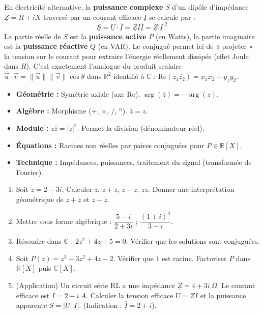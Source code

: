 \documentclass[11pt]{article}
\begin{document}
\begin{savaistu}
En électricité alternative, la \textbf{puissance complexe} $\underline{S}$ d'un dipôle d'impédance $\underline{Z} = R + iX$ traversé par un courant efficace $\underline{I}$ se calcule par :
\[
\underline{S} = \underline{U} \cdot \overline{\underline{I}} = \underline{Z} \underline{I} \overline{\underline{I}} = \underline{Z} |\underline{I}|^2
\]
La partie réelle de $\underline{S}$ est la \textbf{puissance active} $P$ (en Watts), la partie imaginaire est la \textbf{puissance réactive} $Q$ (en VAR).
Le conjugué permet ici de « projeter » la tension sur le courant pour extraire l'énergie réellement dissipée (effet Joule dans $R$). C'est exactement l'analogue du produit scalaire $\vec{u} \cdot \vec{v} = \|\vec{u}\|\|\vec{v}\|\cos\theta$ dans $\mathbb{R}^2$ identifié à $\mathbb{C}$ : $\text{Re}(z_1 \overline{z_2}) = x_1 x_2 + y_1 y_2$.
\end{savaistu}

\begin{aretenir}
\begin{itemize}
    \item \textbf{Géométrie :} Symétrie axiale (axe Re). $\arg(\overline{z}) = -\arg(z)$.
    \item \textbf{Algèbre :} Morphisme ($+$, $\times$, $/$, $^n$). $\overline{\overline{z}}=z$.
    \item \textbf{Module :} $z\overline{z} = |z|^2$. Permet la division (dénominateur réel).
    \item \textbf{Équations :} Racines non réelles par paires conjuguées pour $P \in \mathbb{R}[X]$.
    \item \textbf{Technique :} Impédances, puissances, traitement du signal (transformée de Fourier).
\end{itemize}
\end{aretenir}

\begin{exercice}
\begin{enumerate}
    \item Soit $z = 2 - 3i$. Calculer $\overline{z}$, $z+\overline{z}$, $z-\overline{z}$, $z\overline{z}$. Donner une interprétation géométrique de $z+\overline{z}$ et $z-\overline{z}$.
    \item Mettre sous forme algébrique : $\dfrac{5-i}{2+3i}$ ; $\dfrac{(1+i)^2}{3-i}$.
    \item Résoudre dans $\mathbb{C}$ : $2z^2 + 4z + 5 = 0$. Vérifier que les solutions sont conjuguées.
    \item Soit $P(z) = z^3 - 3z^2 + 4z - 2$. Vérifier que $1$ est racine. Factoriser $P$ dans $\mathbb{R}[X]$ puis $\mathbb{C}[X]$.
    \item (Application) Un circuit série RL a une impédance $\underline{Z} = 4 + 3i \ \Omega$. Le courant efficace est $\underline{I} = 2 - i \ A$. Calculer la tension efficace $\underline{U} = \underline{Z}\underline{I}$ et la puissance apparente $S = |\underline{U}||\underline{I}|$. (Indication : $\overline{\underline{I}} = 2+i$).
\end{enumerate}
\end{exercice}
\end{document}
